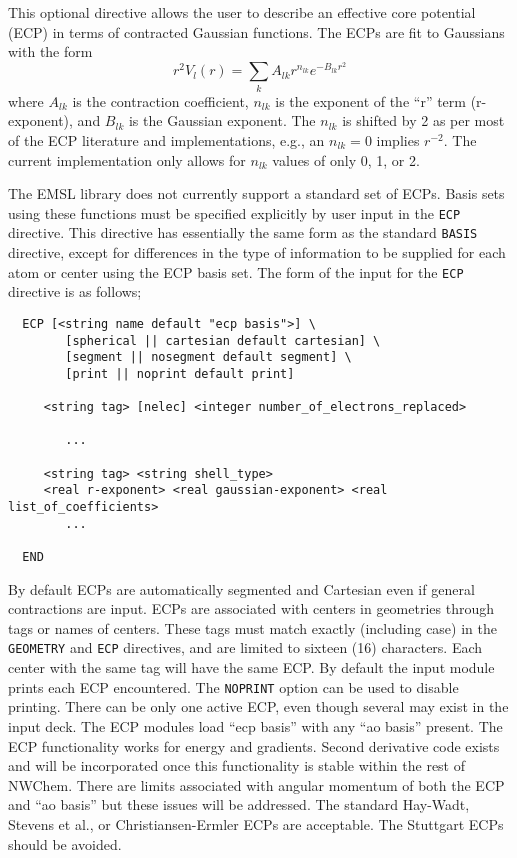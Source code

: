 \label{sec:ecp}

This optional directive allows the user to describe an effective core
potential (ECP) in terms of contracted Gaussian functions.  The ECPs
are fit to Gaussians with the form
\[
 r^2V_l(r) = \sum_{k} A_{lk} r^{n_{lk}} e^{-B_{lk}r^{2}}
\]
where $A_{lk}$ is the contraction coefficient, $n_{lk}$ is the
exponent of the ``r'' term (r-exponent), and $B_{lk}$ is the Gaussian
exponent.  The $n_{lk}$ is shifted by 2 as per most of the ECP
literature and implementations, e.g., an $n_{lk} = 0$ implies
$r^{-2}$.  The current implementation only allows for $n_{lk}$ values
of only 0, 1, or 2. 

The EMSL library does not currently support a standard set of ECPs.
Basis sets using these functions must be specified explicitly by user
input in the \verb+ECP+ directive.  This directive has essentially the
same form as the standard \verb+BASIS+ directive, except for
differences in the type of information to be supplied for each atom or
center using the ECP basis set.  The form of the input for the
\verb+ECP+ directive is as follows;

\begin{verbatim}
  ECP [<string name default "ecp basis">] \
        [spherical || cartesian default cartesian] \
        [segment || nosegment default segment] \
        [print || noprint default print]

     <string tag> [nelec] <integer number_of_electrons_replaced>
 
        ...

     <string tag> <string shell_type>
     <real r-exponent> <real gaussian-exponent> <real list_of_coefficients>
        ...
     
  END
\end{verbatim}    

By default ECPs are automatically segmented and Cartesian even if
general contractions are input.  ECPs are associated with centers in
geometries through tags or names of centers.  These tags must match
exactly (including case) in the \verb+GEOMETRY+ and \verb+ECP+
directives, and are limited to sixteen (16) characters.  Each center
with the same tag will have the same ECP.  By default the input module
prints each ECP encountered.  The \verb+NOPRINT+ option can be used to
disable printing.  There can be only one active ECP, even though
several may exist in the input deck.  The ECP modules load ``ecp
basis'' with any ``ao basis'' present.  The ECP functionality works
for energy and gradients.  Second derivative code exists and will be
incorporated once this functionality is stable within the rest of
NWChem.  There are limits associated with angular momentum of both the
ECP and ``ao basis'' but these issues will be addressed. The standard
Hay-Wadt, Stevens et al., or Christiansen-Ermler ECPs are acceptable.
The Stuttgart ECPs should be avoided.

